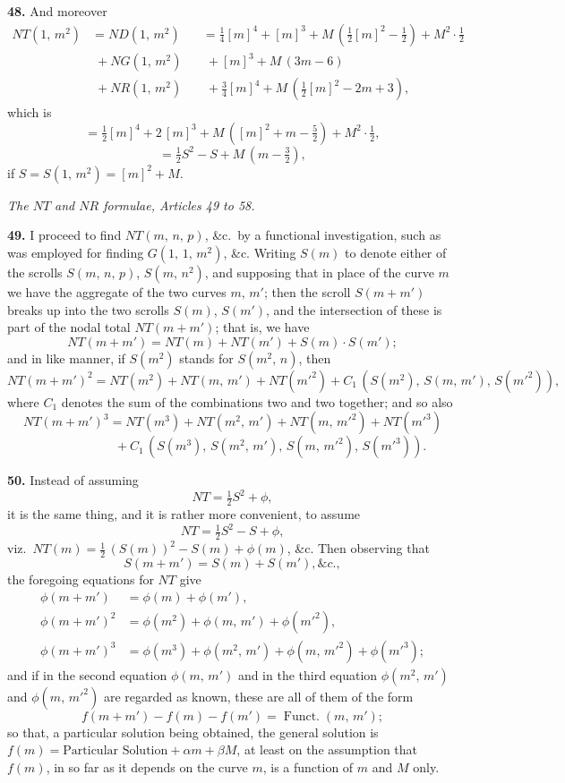 \documentclass[11pt,a4paper]{article}
\providecommand{\Funct}{\operatorname{Funct.}}
\begin{document}
\medskip

\textbf{48.} And moreover
\begin{align*}
NT(1,\,m^2) &= ND(1,\,m^2) && = \tfrac{1}{4}[m]^4 + [m]^3 + M\,(\tfrac{1}{2}[m]^2 - \tfrac{1}{2}) + M^2 \cdot \tfrac{1}{2}\\
            &\;+ NG(1,\,m^2) && \;+ [m]^3 + M\,(3m - 6)\\
            &\;+ NR(1,\,m^2) && \;+ \tfrac{3}{4}[m]^4 + M\,(\tfrac{1}{2}[m]^2 - 2m + 3),
\end{align*}
which is
\[
= \tfrac{1}{2}[m]^4 + 2\,[m]^3 + M\,([m]^2 + m - \tfrac{5}{2}) + M^2 \cdot \tfrac{1}{2},
\]
\[
= \tfrac{1}{2}S^2 - S + M\,(m - \tfrac{3}{2}),
\]
if $S = S(1,\,m^2) = [m]^2 + M$.

\bigskip

\begin{center}
\textit{The $NT$ and $NR$ formulae, Articles 49 to 58.}
\end{center}

\textbf{49.} I proceed to find $NT(m,\,n,\,p)$, \&c.\ by a functional investigation, such as was employed for finding $G(1,\,1,\,m^2)$, \&c. Writing $S(m)$ to denote either of the scrolls $S(m,\,n,\,p)$, $S(m,\,n^2)$, and supposing that in place of the curve $m$ we have the aggregate of the two curves $m,\,m'$; then the scroll $S(m+m')$ breaks up into the two scrolls $S(m)$, $S(m')$, and the intersection of these is part of the nodal total $NT(m+m')$; that is, we have
\[
NT(m+m') = NT(m) + NT(m') + S(m) \cdot S(m');
\]
and in like manner, if $S(m^2)$ stands for $S(m^2,\,n)$, then
\[
NT(m+m')^2 = NT(m^2) + NT(m,\,m') + NT(m'^2) + C_1\,(S(m^2),\,S(m,\,m'),\,S(m'^2)),
\]
where $C_1$ denotes the sum of the combinations two and two together; and so also
\[
NT(m+m')^3 = NT(m^3) + NT(m^2,\,m') + NT(m,\,m'^2) + NT(m'^3)
\]
\[
\hspace{6em} + C_1\,(S(m^3),\,S(m^2,\,m'),\,S(m,\,m'^2),\,S(m'^3)).
\]

\medskip

\textbf{50.} Instead of assuming
\[
NT = \tfrac{1}{2}S^2 + \phi,
\]
it is the same thing, and it is rather more convenient, to assume
\[
NT = \tfrac{1}{2}S^2 - S + \phi,
\]
viz.\ $NT(m) = \tfrac{1}{2}\,(S(m))^2 - S(m) + \phi(m)$, \&c. Then observing that
\[
S(m+m') = S(m) + S(m'), \&c.,
\]
the foregoing equations for $NT$ give
\begin{align*}
\phi(m+m') &= \phi(m) + \phi(m'),\\
\phi(m+m')^2 &= \phi(m^2) + \phi(m,\,m') + \phi(m'^2),\\
\phi(m+m')^3 &= \phi(m^3) + \phi(m^2,\,m') + \phi(m,\,m'^2) + \phi(m'^3);
\end{align*}
and if in the second equation $\phi(m,\,m')$ and in the third equation $\phi(m^2,\,m')$ and $\phi(m,\,m'^2)$ are regarded as known, these are all of them of the form
\[
f(m+m') - f(m) - f(m') = \Funct(m,\,m');
\]
so that, a particular solution being obtained, the general solution is $f(m) = \text{Particular Solution} + \alpha m + \beta M$, at least on the assumption that $f(m)$, in so far as it depends on the curve $m$, is a function of $m$ and $M$ only.
\end{document}
